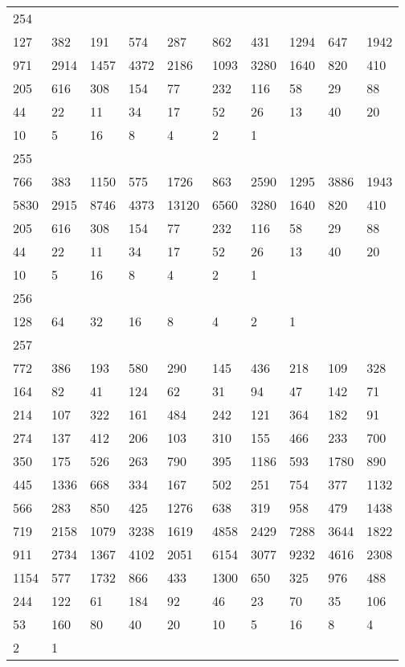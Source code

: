 \begin{longtable}{*{10}{l}}
254&&&&&&&&&\\
127& 382& 191& 574& 287& 862& 431& 1294& 647& 1942\\
971& 2914& 1457& 4372& 2186& 1093& 3280& 1640& 820& 410\\
205& 616& 308& 154& 77& 232& 116& 58& 29& 88\\
44& 22& 11& 34& 17& 52& 26& 13& 40& 20\\
10& 5& 16& 8& 4& 2& 1& \\

255&&&&&&&&&\\
766& 383& 1150& 575& 1726& 863& 2590& 1295& 3886& 1943\\
5830& 2915& 8746& 4373& 13120& 6560& 3280& 1640& 820& 410\\
205& 616& 308& 154& 77& 232& 116& 58& 29& 88\\
44& 22& 11& 34& 17& 52& 26& 13& 40& 20\\
10& 5& 16& 8& 4& 2& 1& \\

256&&&&&&&&&\\
128& 64& 32& 16& 8& 4& 2& 1& \\

257&&&&&&&&&\\
772& 386& 193& 580& 290& 145& 436& 218& 109& 328\\
164& 82& 41& 124& 62& 31& 94& 47& 142& 71\\
214& 107& 322& 161& 484& 242& 121& 364& 182& 91\\
274& 137& 412& 206& 103& 310& 155& 466& 233& 700\\
350& 175& 526& 263& 790& 395& 1186& 593& 1780& 890\\
445& 1336& 668& 334& 167& 502& 251& 754& 377& 1132\\
566& 283& 850& 425& 1276& 638& 319& 958& 479& 1438\\
719& 2158& 1079& 3238& 1619& 4858& 2429& 7288& 3644& 1822\\
911& 2734& 1367& 4102& 2051& 6154& 3077& 9232& 4616& 2308\\
1154& 577& 1732& 866& 433& 1300& 650& 325& 976& 488\\
244& 122& 61& 184& 92& 46& 23& 70& 35& 106\\
53& 160& 80& 40& 20& 10& 5& 16& 8& 4\\
2& 1& \\


\end{longtable}
